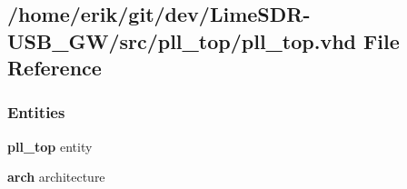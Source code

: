 \subsection{/home/erik/git/dev/\+Lime\+S\+D\+R-\/\+U\+S\+B\+\_\+\+G\+W/src/pll\+\_\+top/pll\+\_\+top.vhd File Reference}
\label{pll__top_8vhd}
\subsubsection*{Entities}
\begin{DoxyCompactItemize}
\item 
{\bf pll\+\_\+top} entity
\item 
{\bf arch} architecture
\end{DoxyCompactItemize}
